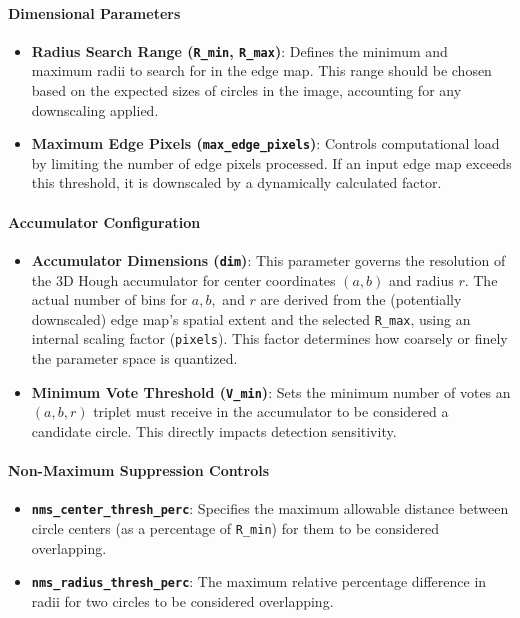 \documentclass[12pt,a4paper]{article}
\begin{document}
\paragraph{Dimensional Parameters}
\begin{itemize}
    \item \textbf{Radius Search Range (\texttt{R\_min}, \texttt{R\_max})}: Defines the minimum and maximum radii to search for in the edge map. This range should be chosen based on the expected sizes of circles in the image, accounting for any downscaling applied.
    
    \item \textbf{Maximum Edge Pixels (\texttt{max\_edge\_pixels})}: Controls computational load by limiting the number of edge pixels processed. If an input edge map exceeds this threshold, it is downscaled by a dynamically calculated factor.
\end{itemize}

\paragraph{Accumulator Configuration}
\begin{itemize}

    \item \textbf{Accumulator Dimensions (\texttt{dim})}: This parameter governs the resolution of the 3D Hough accumulator for center coordinates $(a, b)$ and radius $r$. The actual number of bins for $a, b,$ and $r$ are derived from the (potentially downscaled) edge map's spatial extent and the selected \texttt{R\_max}, using an internal scaling factor (\texttt{pixels}). This factor determines how coarsely or finely the parameter space is quantized. 

    \item \textbf{Minimum Vote Threshold (\texttt{V\_min})}: Sets the minimum number of votes an $(a,b,r)$ triplet must receive in the accumulator to be considered a candidate circle. This directly impacts detection sensitivity.
\end{itemize}

\paragraph{Non-Maximum Suppression Controls}
\begin{itemize}
    \item \textbf{\texttt{nms\_center\_thresh\_perc}}: Specifies the maximum allowable distance between circle centers (as a percentage of \texttt{R\_min}) for them to be considered overlapping.
    
    \item \textbf{\texttt{nms\_radius\_thresh\_perc}}: The maximum relative percentage difference in radii for two circles to be considered overlapping.
\end{itemize}
\end{document}
